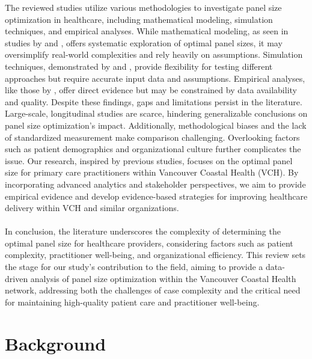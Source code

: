 \documentclass[11pt]{article}
\theoremstyle{definition}
\begin{document}
The reviewed studies utilize various methodologies to investigate panel size optimization in healthcare, including mathematical modeling, simulation techniques, and empirical analyses. While mathematical modeling, as seen in studies by \cite{dahrouge2016} and \cite{joe2020}, offers systematic exploration of optimal panel sizes, it may oversimplify real-world complexities and rely heavily on assumptions. Simulation techniques, demonstrated by \cite{shukor2018} and \cite{zimmerman2021}, provide flexibility for testing different approaches but require accurate input data and assumptions. Empirical analyses, like those by \cite{elkhuizen2007}, offer direct evidence but may be constrained by data availability and quality. Despite these findings, gaps and limitations persist in the literature. Large-scale, longitudinal studies are scarce, hindering generalizable conclusions on panel size optimization's impact. Additionally, methodological biases and the lack of standardized measurement make comparison challenging. Overlooking factors such as patient demographics and organizational culture further complicates the issue. Our research, inspired by previous studies, focuses on the optimal panel size for primary care practitioners within Vancouver Coastal Health (VCH). By incorporating advanced analytics and stakeholder perspectives, we aim to provide empirical evidence and develop evidence-based strategies for improving healthcare delivery within VCH and similar organizations.\\\\
In conclusion, the literature underscores the complexity of determining the optimal panel size for healthcare providers, considering factors such as patient complexity, practitioner well-being, and organizational efficiency. This review sets the stage for our study’s contribution to the field, aiming to provide a data-driven analysis of panel size optimization within the Vancouver Coastal Health network, addressing both the challenges of case complexity and the critical need for maintaining high-quality patient care and practitioner well-being.

\section{Background}
\end{document}
